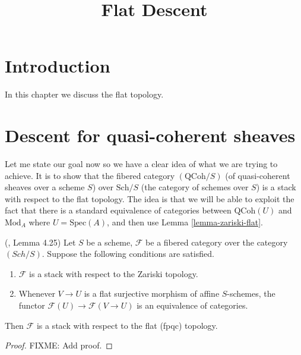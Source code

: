 

%


\title{Flat Descent}

\maketitle

\tableofcontents

\section{Introduction}
\label{section-introduction}

\noindent
In this chapter we discuss the flat topology.

\section{Descent for quasi-coherent sheaves}
\label{section-equivalence}

\noindent
Let me state our goal now so we have a clear idea of what we are
trying to achieve. It is to show that the fibered category $(\text{QCoh}/S)$
(of quasi-coherent sheaves over a scheme $S$) over $\text{Sch}/S$ (the
category of schemes over $S$) is a stack with respect to the flat
topology.  The idea is that we will be able to exploit the fact that
there is a standard equivalence of categories between $\text{QCoh}(U)$ and
$\text{Mod}_A$ where $U = \text{Spec}(A)$, and then use Lemma
\ref{lemma-zariski-flat}.

\begin{lemma}
\label{lemma-zariski-flat}
(\cite{Vis2}, Lemma 4.25)
Let $S$ be a scheme, $\mathcal F$ be a fibered category over the
category $(Sch/S)$.  Suppose the following conditions are satisfied.
\begin{enumerate}
\item $\mathcal F$ is a stack with respect to the Zariski topology.
\item Whenever $V \rightarrow U$ is a flat surjective morphism of affine
$S$-schemes, the functor
$\mathcal F(U) \rightarrow  \mathcal F(V \rightarrow U)$ is an equivalence of
categories.
\end{enumerate}
Then $\mathcal F$ is a stack with respect to the flat (fpqc) topology.	
\end{lemma}
\begin{proof}
FIXME: Add proof.
\end{proof}

